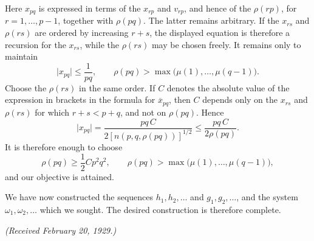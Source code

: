 \documentclass[
  paper=b5,
  twoside=true,
  fontsize=13pt,
  headings=normal,
  bookmarkpackage=false
]{scrartcl}
\theoremstyle{definition}
\begin{document}
Here \(x_{pq}\) is expressed in terms of the \(x_{rp}\) and \(v_{rp}\),
and hence of the \(\rho(rp)\), for \(r=1,\ldots,p-1\), together with
\(\rho(pq)\).  The latter remains arbitrary.  If the \(x_{rs}\) and
\(\rho(rs)\) are ordered by increasing \(r+s\), the displayed equation
is therefore a recursion for the \(x_{rs}\), while the \(\rho(rs)\) may
be chosen freely.  It remains only to maintain
\[
  \lvert x_{pq}\rvert\leq\frac1{pq},
  \qquad
  \rho(pq)>
  \max\bigl(\mu(1),\ldots,\mu(q-1)\bigr).
\]
Choose the \(\rho(rs)\) in the same order.  If \(C\) denotes the absolute
value of the expression in brackets in the formula for
\(\overline{x}_{pq}\), then \(C\) depends only on the \(x_{rs}\) and
\(\rho(rs)\) for which \(r+s<p+q\), and not on \(\rho(pq)\).  Hence
\[
  \lvert x_{pq}\rvert
  =
  \frac{pq\,C}{2[n(p,q,\rho(pq))]^{1/2}}
  \leq
  \frac{pq\,C}{2\rho(pq)}.
\]
It is therefore enough to choose
\[
  \rho(pq)\geq\frac12 Cp^{2}q^{2},
  \qquad
  \rho(pq)>
  \max\bigl(\mu(1),\ldots,\mu(q-1)\bigr),
\]
and our objective is attained.

We have now constructed the sequences \(h_{1},h_{2},\ldots\) and
\(g_{1},g_{2},\ldots\), and the system \(\omega_{1},\omega_{2},\ldots\)
which we sought. The desired construction is therefore complete.

\begin{center}
  \emph{(Received February 20, 1929.)}
\end{center}
\end{document}
